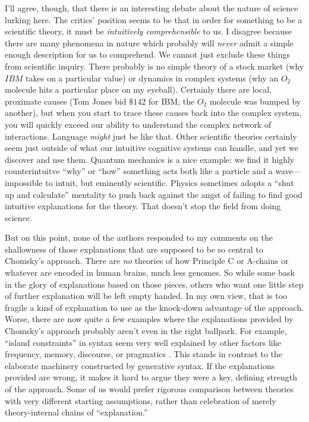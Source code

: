 \documentclass[output=paper,colorlinks,citecolor=brown
]{langscibook}
\begin{document}
I'll agree, though, that there is an interesting debate about the nature of science lurking here. The critics' position seems to be that in order for something to be a scientific theory, it must be \emph{intuitively comprehensible} to us. I disagree because there are many phenomena in nature which probably will \emph{never} admit a simple enough description for us to comprehend. We cannot just exclude these things from scientific inquiry. There probably is no simple theory of a stock market (why $IBM$ takes on a particular value) or dynamics in complex systems (why an $O_2$ molecule hits a particular place on my eyeball). Certainly there are local, proximate causes (Tom Jones bid  $\$142$ for IBM; the $O_2$ molecule was bumped by another), but when you start to trace these causes back into the complex system, you will quickly exceed our ability to understand the complex network of interactions. Language \emph{might} just be like that. Other scientific theories certainly seem just outside of what our intuitive cognitive systems can handle, and yet we discover and use them. Quantum mechanics is a nice example: we find it highly counterintuitve ``why'' or ``how'' something acts both like a particle and a wave---impossible to intuit, but eminently scientific. Physics sometimes adopts a ``shut up and calculate'' mentality \citep{david1989s} to push back against the angst of failing to find good intuitive explanations for the theory. That doesn't stop the field from doing science. 

But on this point, none of the authors responded to my comments on the shallowness of those explanations that are supposed to be so central to Chomsky's approach. There are \emph{no} theories of how Principle C or A-chains or whatever are encoded in human brains, much less genomes. So while some bask in the glory of explanations based on those pieces, others who want one little step of further explanation will be left empty handed. In my own view, that is too fragile a kind of explanation to use as the knock-down advantage of the approach. Worse, there are now quite a few examples where the explanations provided by Chomsky's approach probably aren't even in the right ballpark. For example, ``island constraints'' in syntax seem very well explained by other factors like frequency, memory, discourse, or pragmatics \citep{kluender1992deriving,kluender1993subjacency,kehler2002coherence,chaves2020unbounded,goldberg2006constructions,liu2022structural,winckel2021french,ambridge2008island,abeille2020extraction,liu2022structural,liu2022verb,cuneo2023discourse}. This stands in contrast to the elaborate machinery constructed by generative syntax. If the explanations provided are wrong, it makes it hard to argue they were a key, defining strength of the approach. Some of us would prefer rigorous comparison between theories with very different starting assumptions, rather than celebration of merely theory-internal chains of ``explanation.''
\end{document}
